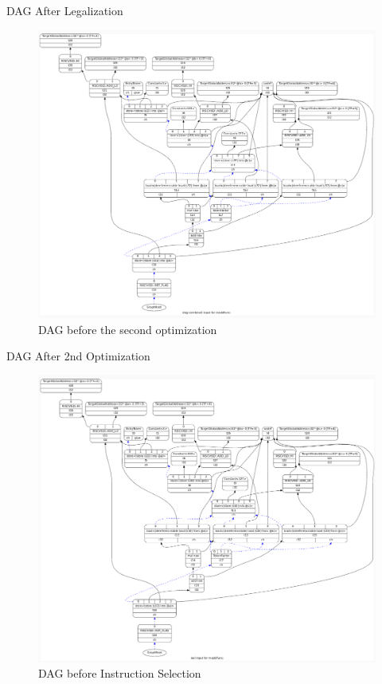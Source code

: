 \begin{frame}{DAG After Legalization}
    \begin{figure}
    \centering
    \includegraphics[height=0.75\textheight]{path_instruction/madd_dag_combine2.png}
    \caption{DAG before the second optimization}
    \label{fig:combine2}
\end{figure}
\end{frame}

\begin{frame}{DAG After 2nd Optimization}
    \begin{figure}
    \centering
    \includegraphics[height=0.75\textheight]{path_instruction/madd_dag_isel.png}
    \caption{DAG before Instruction Selection}
    \label{fig:isel}
\end{figure}
\end{frame}

